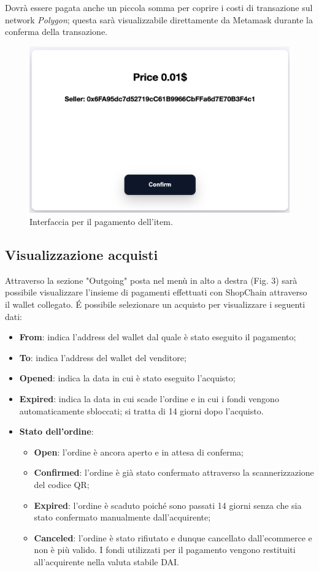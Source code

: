 \documentclass[a4paper, 12pt]{article}
\begin{document}
Dovrà essere pagata anche un piccola somma per coprire i costi di transazione sul network \textit{Polygon}; questa sarà visualizzabile direttamente da Metamask durante la conferma della transazione.

\FloatBarrier
\begin{figure}
\centering
\includegraphics[width=0.5\linewidth]{img/oggetto_in_vendita.png}
\caption{Interfaccia per il pagamento dell'item.}
\end{figure}
\FloatBarrier

\subsection{Visualizzazione acquisti}
Attraverso la sezione "Outgoing" posta nel menù in alto a destra (Fig. 3) sarà possibile visualizzare l'insieme di pagamenti effettuati con ShopChain attraverso il wallet collegato.
É possibile selezionare un acquisto per visualizzare i seguenti dati:
\begin{itemize}
\item \textbf{From}: indica l'address del wallet dal quale è stato eseguito il pagamento;
\item \textbf{To}: indica l'address del wallet del venditore;
\item \textbf{Opened}: indica la data in cui è stato eseguito l'acquisto;
\item \textbf{Expired}: indica la data in cui scade l'ordine e in cui i fondi vengono automaticamente sbloccati; si tratta di 14 giorni dopo l'acquisto.
\item \textbf{Stato dell'ordine}:
  \begin{itemize}
    \item \textbf{Open}: l'ordine è ancora aperto e in attesa di conferma;
    \item \textbf{Confirmed}: l'ordine è già stato confermato attraverso la scannerizzazione del codice QR;
    \item \textbf{Expired}: l'ordine è scaduto poiché sono passati 14 giorni senza che sia stato confermato manualmente dall'acquirente;
    \item \textbf{Canceled}: l'ordine è stato rifiutato e dunque cancellato dall'ecommerce e non è più valido. I fondi utilizzati per il pagamento vengono restituiti all'acquirente nella valuta stabile DAI.
  \end{itemize}
\end{itemize}
\end{document}
